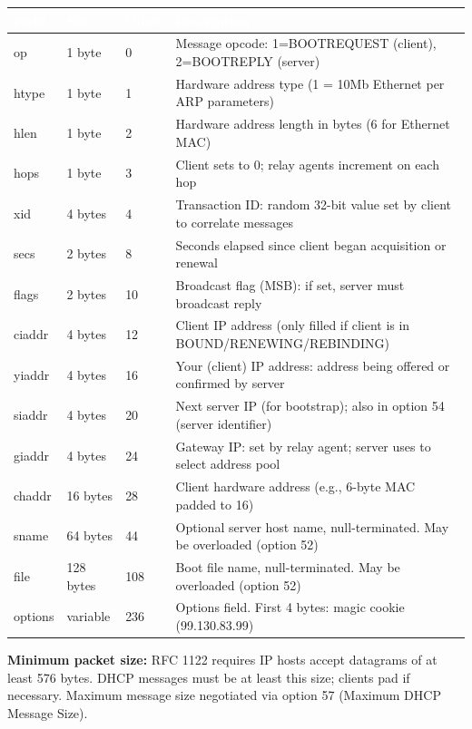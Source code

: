 \documentclass[11pt,letterpaper]{article}
\newcommand{\tableheader}[1]{\textbf{\sffamily\textcolor{white}{#1}}}
\begin{document}
\begin{center}
\begin{tabularx}{\textwidth}{C{1.2cm}C{1.5cm}C{2cm}X}
\toprule
{}
\tableheader{Field} & \tableheader{Size} & \tableheader{Offset} & \tableheader{Description} \\
\midrule
op & 1 byte & 0 & Message opcode: 1=BOOTREQUEST (client), 2=BOOTREPLY (server) \\
htype & 1 byte & 1 & Hardware address type (1 = 10Mb Ethernet per ARP parameters) \\
hlen & 1 byte & 2 & Hardware address length in bytes (6 for Ethernet MAC) \\
hops & 1 byte & 3 & Client sets to 0; relay agents increment on each hop \\
xid & 4 bytes & 4 & Transaction ID: random 32-bit value set by client to correlate messages \\
secs & 2 bytes & 8 & Seconds elapsed since client began acquisition or renewal \\
flags & 2 bytes & 10 & Broadcast flag (MSB): if set, server must broadcast reply \\
ciaddr & 4 bytes & 12 & Client IP address (only filled if client is in BOUND/RENEWING/REBINDING) \\
yiaddr & 4 bytes & 16 & Your (client) IP address: address being offered or confirmed by server \\
siaddr & 4 bytes & 20 & Next server IP (for bootstrap); also in option 54 (server identifier) \\
giaddr & 4 bytes & 24 & Gateway IP: set by relay agent; server uses to select address pool \\
chaddr & 16 bytes & 28 & Client hardware address (e.g., 6-byte MAC padded to 16) \\
sname & 64 bytes & 44 & Optional server host name, null-terminated. May be overloaded (option 52) \\
file & 128 bytes & 108 & Boot file name, null-terminated. May be overloaded (option 52) \\
options & variable & 236 & Options field. First 4 bytes: magic cookie (99.130.83.99) \\
\bottomrule
\end{tabularx}
\end{center}

\textbf{Minimum packet size:} RFC 1122 requires IP hosts accept datagrams of at least 576 bytes. DHCP messages must be at least this size; clients pad if necessary. Maximum message size negotiated via option 57 (Maximum DHCP Message Size).
\end{document}
